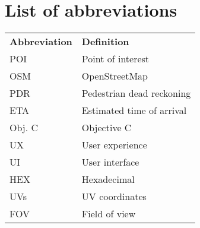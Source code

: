 \chapter{List of abbreviations}
\label{appendix:abbreviations}

\vspace*{25px}
\begin{tabular}{lp{5cm}}
    \textbf{Abbreviation}               &               \textbf{Definition} \\
    POI                                 &               Point of interest \\
    OSM                                 &               OpenStreetMap \\
    PDR                                 &               Pedestrian dead reckoning \\
    ETA                                 &               Estimated time of arrival \\
    Obj. C                              &               Objective C \\
    UX                                  &               User experience \\
    UI                                  &               User interface \\
    HEX                                 &               Hexadecimal \\
    UVs                                 &               UV coordinates \\
    FOV                                 &               Field of view \\
\end{tabular}